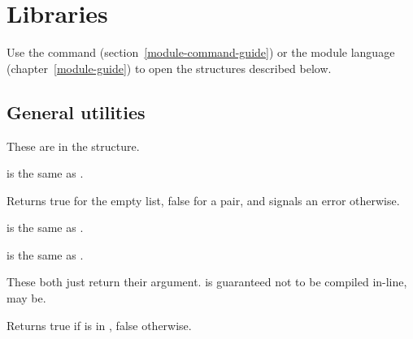 

\chapter{Libraries}

Use the
 command (section~\ref{module-command-guide})
 or
the module language (chapter~\ref{module-guide})
 to open the structures described below.

\section{General utilities}
\label{big-util}


These are in the  structure.

\begin{protos}
\end{protos}
%
 is the same as .

\begin{protos}
\end{protos}
%
Returns true for the empty list, false for a pair, and signals an
error otherwise.

\begin{protos}
\end{protos}
 is the same as .

\begin{protos}
\end{protos}
 is the same as .

\begin{protos}
\end{protos}
These both just return their argument.   is guaranteed not to
be compiled in-line,  may be.

\begin{protos}
\end{protos}
%
Returns true if  is in , false otherwise.

